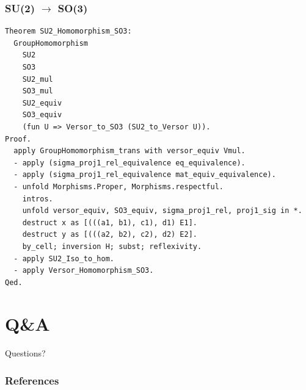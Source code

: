 \documentclass{beamer}
\begin{document}
\begin{frame}[fragile]
\frametitle{SU(2) $\to$ SO(3)}
\begin{lstlisting}[language=Coq, basicstyle=\tiny]
Theorem SU2_Homomorphism_SO3:
  GroupHomomorphism
    SU2
    SO3
    SU2_mul
    SO3_mul
    SU2_equiv
    SO3_equiv
    (fun U => Versor_to_SO3 (SU2_to_Versor U)).
Proof.
  apply GroupHomomorphism_trans with versor_equiv Vmul.
  - apply (sigma_proj1_rel_equivalence eq_equivalence).
  - apply (sigma_proj1_rel_equivalence mat_equiv_equivalence).
  - unfold Morphisms.Proper, Morphisms.respectful.
    intros.
    unfold versor_equiv, SO3_equiv, sigma_proj1_rel, proj1_sig in *.
    destruct x as [(((a1, b1), c1), d1) E1].
    destruct y as [(((a2, b2), c2), d2) E2].
    by_cell; inversion H; subst; reflexivity.
  - apply SU2_Iso_to_hom.
  - apply Versor_Homomorphism_SO3.
Qed.
\end{lstlisting}
\end{frame}

\section{Q\&A}

\begin{frame}[c]
\begin{center}
\Huge Questions?
\end{center}
\end{frame}

\begin{frame}[allowframebreaks]
        \frametitle{References}
        
        
\end{frame}
\end{document}
